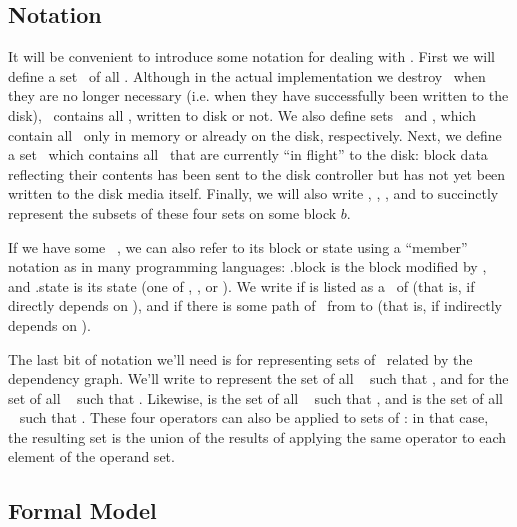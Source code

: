 \subsection{Notation}
\label{sec:chdescs:notation}

It will be convenient to introduce some notation for dealing with \chdescs.
First we will define a set \ChAll\ of all \chdescs. Although in the actual
implementation we destroy \chdescs\ when they are no longer necessary (i.e. when
they have successfully been written to the disk), \ChAll\ contains all \chdescs,
written to disk or not. We also define sets \ChMem\ and \ChDisk, which contain
all \chdescs\ only in memory or already on the disk, respectively. Next, we
define a set \ChInf\ which contains all \chdescs\ that are currently ``in
flight'' to the disk: block data reflecting their contents has been sent to the
disk controller but has not yet been written to the disk media itself. Finally,
we will also write , , , and  to
succinctly represent the subsets of these four sets on some block $b$.

If we have some \chdesc\ , we can also refer to its block or state using a
``member'' notation as in many programming languages: .block is the block
modified by , and .state is its state (one of \statenone, \stateinf,
or \statedisk). We write  if  is listed as a \before\
of  (that is, if  directly depends on ), and
 if there is some path of \befores\ from  to
\p{q} (that is, if \p{p} indirectly depends on ).

The last bit of notation we'll need is for representing sets of \chdescs\
related by the dependency graph. We'll write  to represent the set of
all \chdescs\  such that \depends{p}{q}, and \BeforeS{p} for the set of all
\chdescs\  such that \indirdepends{p}{q}. Likewise, \After{p} is the set of
all \chdescs\ \p{q} such that \depends{q}{p}, and \AfterS{p} is the set of all
\chdescs\ \p{q} such that \indirdepends{q}{p}. These four operators can also be
applied to sets of \chdescs: in that case, the resulting set is the union of the
results of applying the same operator to each element of the operand set.

\subsection{Formal Model}
\label{sec:chdescs:model}


